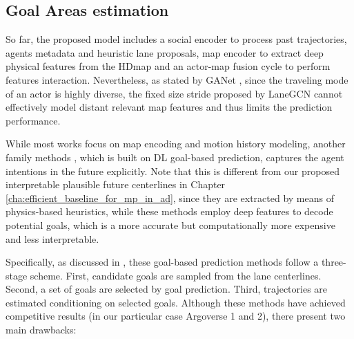 \subsection{Goal Areas estimation}
\label{subsec:7_improving_efficiency_goal_areas_estimation}

So far, the proposed model includes a social encoder to process past trajectories, agents metadata and heuristic lane proposals, map encoder to extract deep physical features from the \ac{HDmap} and an actor-map fusion cycle to perform features interaction. Nevertheless, as stated by GANet \cite{wang2022ganet}, since the traveling mode of an actor is highly diverse, the fixed size stride proposed by LaneGCN cannot effectively model distant relevant map features and thus limits the prediction performance.

While most works \cite{mercat2020multi,casas2018intentnet,chai2019multipath,liang2020learning} focus on map encoding and motion history modeling, another family methods \cite{zhao2021tnt,gu2021densetnt, dendorfer2020goal}, which is built on \ac{DL} goal-based prediction, captures the agent intentions in the future explicitly. Note that this is different from our proposed interpretable plausible future centerlines in Chapter \ref{cha:efficient_baseline_for_mp_in_ad}, since they are extracted by means of physics-based heuristics, while these methods employ deep features to decode potential goals, which is a more accurate but computationally more expensive and less interpretable.

Specifically, as discussed in \cite{wang2022ganet}, these goal-based prediction methods follow a three-stage scheme. First, candidate goals are sampled from the lane centerlines. Second, a set of goals are selected by goal prediction. Third, trajectories are estimated conditioning on selected goals. Although these methods have achieved competitive results (in our particular case Argoverse 1 and 2), there present two main drawbacks:

